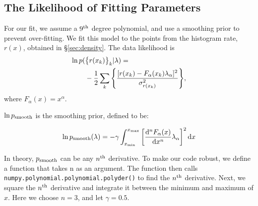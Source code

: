 \subsection{The Likelihood of Fitting Parameters}
\label{subsec:likelihood}

For our fit, we assume a $9^{\rm th}$ degree polynomial, and use a smoothing prior to prevent over-fitting. We fit this model to the points from the histogram rate, $r(x)$, obtained in \S\ref{sec:density}. The data likelihood is
%
\begin{align}
  \ln p( &\qty{r(x_k)}_k | \lambda ) = \notag
  \\ &
 -\frac{1}{2}
  \sum_k
  \qty{\frac{[r(x_k) - F_\alpha(x_k) \lambda_\alpha]^2}{\sigma_{r(x_k)}^2}},
%
  \label{likelihood}
\end{align}
%
where $F_\alpha(x) = x^\alpha$.

$\ln p_{\rm smooth}$ is the smoothing prior, defined to be:

\begin{equation}
  \ln p_{\rm smooth}(\lambda) =
 -\gamma \int_{x_{\min}}^{x_{\max}}
  \qty[ \dv[n]{F_\alpha(x)}{x} \lambda_\alpha ]^2 \dd{x}
%
  \label{smoothing_prior}
\end{equation}

In theory, $p_{\rm smooth}$ can be any $n^{\rm th}$ derivative. To make our code robust, we define a function that takes n as an argument. The function then calls \texttt{numpy.polynomial.polynomial.polyder()} to find the $n^{\rm th}$ derivative. Next, we square the $n^{\rm th}$ derivative and integrate it between the minimum and maximum of $x$. Here we choose $n = 3$, and let $\gamma = 0.5$.